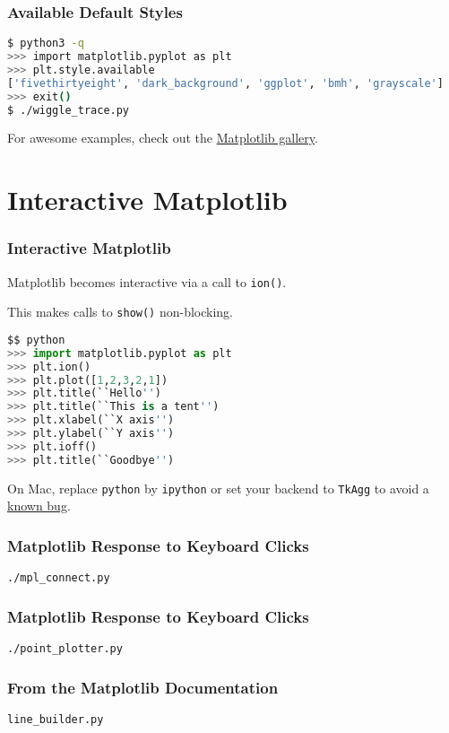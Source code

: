 \documentclass{beamer}
\begin{document}
\begin{frame}[fragile]
\frametitle{Available Default Styles}

\begin{lstlisting}[language=bash]
$ python3 -q
>>> import matplotlib.pyplot as plt
>>> plt.style.available
['fivethirtyeight', 'dark_background', 'ggplot', 'bmh', 'grayscale']
>>> exit()
$ ./wiggle_trace.py
\end{lstlisting}
\end{frame}

\begin{frame}
For awesome examples, check out the \href{http://matplotlib.org/gallery.html}{Matplotlib gallery}.
\end{frame}

\section{Interactive Matplotlib}
\begin{frame}[fragile]
\frametitle{Interactive Matplotlib}

Matplotlib becomes interactive via a call to \texttt{ion()}.

This makes calls to \texttt{show()} non-blocking.
\begin{lstlisting}[language=Python]
$$ python
>>> import matplotlib.pyplot as plt
>>> plt.ion()
>>> plt.plot([1,2,3,2,1])
>>> plt.title(``Hello'')
>>> plt.title(``This is a tent'')
>>> plt.xlabel(``X axis'')
>>> plt.ylabel(``Y axis'')
>>> plt.ioff()
>>> plt.title(``Goodbye'')
\end{lstlisting}
On Mac, replace \texttt{python} by \texttt{ipython} or set your backend to \texttt{TkAgg} to avoid a \href{http://stackoverflow.com/questions/25960000/interactive-mode-doesnt-switch-on-from-script-matplotlib-1-4-0-python-2-7-5-on}{known bug}.
\end{frame}

\begin{frame}[fragile]
\frametitle{Matplotlib Response to Keyboard Clicks}
\texttt{./mpl\_connect.py}
\end{frame}

\begin{frame}[fragile]
\frametitle{Matplotlib Response to Keyboard Clicks}
\texttt{./point\_plotter.py}
\end{frame}

\begin{frame}[fragile]
\frametitle{From the Matplotlib Documentation}
\texttt{line\_builder.py}
\end{frame}
\end{document}
